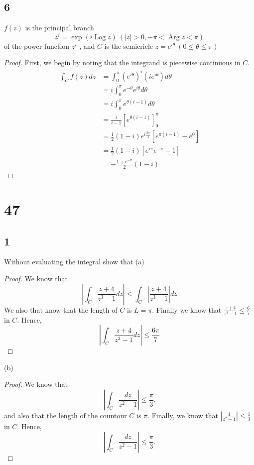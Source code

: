 \documentclass{article}
\DeclareMathOperator*{\Log}{Log}
\DeclareMathOperator*{\Arg}{Arg}
\begin{document}
\subsection*{6}
$f(z)$ is the principal branch
$$z^i = \exp(i\Log z) \ (|z| > 0, -\pi < \Arg z < \pi)$$
of the power function $z^i$ , and $C$ is the semicricle
$z = e^{i\theta} \ (0 \leq \theta \leq \pi)$

\begin{proof}
    First, we begin by noting that the integrand is piecewise continuous in $C$.
    \begin{align*}
        \int_C f(z) dz & = \int_0^\pi (e^{i\theta})^i(ie^{i\theta}) d\theta        \\
                       & = i\int_0^\pi e^{-\theta}e^{i\theta} d\theta              \\
                       & =i\int_0^\pi e^{\theta(i-1)} d\theta                      \\
                       & = \frac{i}{i - 1} [e^{\theta(i -1)}]_0^\pi                \\
                       & = \frac{1}{2}(1 - i)e^{i\frac{3\pi}{4}}[e^{\pi(i-1)}-e^0] \\
                       & = \frac{1}{2}(1-i)[e^{i\pi}e^{-\pi} - 1]                  \\
                       & = -\frac{1 + e^{-\pi}}{2}(1-i)
    \end{align*}
\end{proof}

\section*{47}
\subsection*{1} %
Without evaluating the integral show that
(a)
\begin{proof}
    We know that
    $$\left | \int_C \frac{z + 4}{z^3 -1} dz \right | \leq \int_C \left | \frac{z + 4}{z^3 -1} \right | dz$$
    We also that know that the length of $C$ is $L = \pi$. Finally we know that
    $\frac{z+ 4}{z^3 -1} \leq \frac{6}{7}$ in $C$. Hence,
    $$\left | \int_C \frac{z + 4}{z^3 -1} dz \right | \leq \frac{6\pi}{7}$$
\end{proof}

(b)
\begin{proof}
    We know that
    $$\left | \int_C \frac{dz}{z^2 -1} \right | \leq \frac{\pi}{3}.$$
    and also that the length of the countour $C$ is $\pi$.
    Finally, we know that $\left | \frac{1}{z^2 -1} \right | \leq \frac{1}{3}$ in $C$.
    Hence,
    $$\left | \int_C \frac{dz}{z^2 -1} \right | \leq \frac{\pi}{3}.$$
\end{proof}
\end{document}
